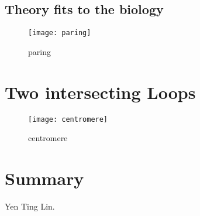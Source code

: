 \subsection{Theory fits to the biology}
\label{sub:theory_fits_to_the_biology}

\begin{figure}[htpb]
    \centering
    \texttt{[image: paring]}
    \caption{paring}
    \label{fig:paring}
\end{figure}


\section{Two intersecting Loops}
\label{sec:two_intersecting_loops}

\begin{figure}[htpb]
    \centering
    \texttt{[image: centromere]}
    \caption{centromere}
    \label{fig:centromere}
\end{figure}

\section{Summary}
\label{sec:summary_chp3}

Yen Ting Lin. 
